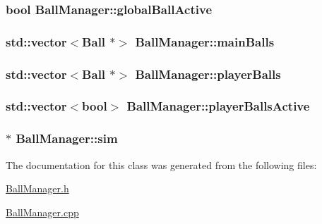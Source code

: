 \hypertarget{classBallManager_a4f86decb02dc070a4ddf4d408620acf4}{
\subsubsection[{global\-Ball\-Active}]{\setlength{\rightskip}{0pt plus 5cm}bool Ball\-Manager\-::global\-Ball\-Active\hspace{0.3cm}{\ttfamily [private]}}}\label{classBallManager_a4f86decb02dc070a4ddf4d408620acf4}
\hypertarget{classBallManager_a3de8a29f89c02241ef9dd1bc85bcb6f8}{
\subsubsection[{main\-Balls}]{\setlength{\rightskip}{0pt plus 5cm}std\-::vector$<${\bf Ball} $\ast$$>$ Ball\-Manager\-::main\-Balls\hspace{0.3cm}{\ttfamily [private]}}}\label{classBallManager_a3de8a29f89c02241ef9dd1bc85bcb6f8}
\hypertarget{classBallManager_aa5d4641a04755987d725c8df64ce5c84}{
\subsubsection[{player\-Balls}]{\setlength{\rightskip}{0pt plus 5cm}std\-::vector$<${\bf Ball} $\ast$$>$ Ball\-Manager\-::player\-Balls}}\label{classBallManager_aa5d4641a04755987d725c8df64ce5c84}
\hypertarget{classBallManager_a1deaf66727d7a5e399712de6412379f2}{
\subsubsection[{player\-Balls\-Active}]{\setlength{\rightskip}{0pt plus 5cm}std\-::vector$<$bool$>$ Ball\-Manager\-::player\-Balls\-Active\hspace{0.3cm}{\ttfamily [private]}}}\label{classBallManager_a1deaf66727d7a5e399712de6412379f2}
\hypertarget{classBallManager_a4916de0948df0af060f6ada4d21284a7}{
\subsubsection[{sim}]{$\ast$ Ball\-Manager\-::sim\hspace{0.3cm}{\ttfamily [private]}}}\label{classBallManager_a4916de0948df0af060f6ada4d21284a7}


The documentation for this class was generated from the following files\-:\begin{DoxyCompactItemize}
\item 
\hyperlink{BallManager_8h}{Ball\-Manager.\-h}\item 
\hyperlink{BallManager_8cpp}{Ball\-Manager.\-cpp}\end{DoxyCompactItemize}
